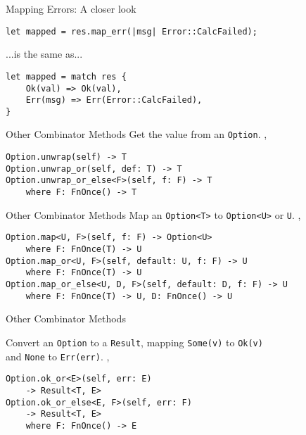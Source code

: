 
\begin{frame}[fragile]{Mapping Errors: A closer look}
\begin{verbatim}
let mapped = res.map_err(|msg| Error::CalcFailed);
\end{verbatim}
...is the same as...
\begin{verbatim}
let mapped = match res {
    Ok(val) => Ok(val),
    Err(msg) => Err(Error::CalcFailed),
}
\end{verbatim}
\end{frame}


\begin{frame}[fragile]{Other Combinator Methods}
Get the value from an \texttt{Option}.
\sep
\begin{verbatim}
Option.unwrap(self) -> T
Option.unwrap_or(self, def: T) -> T
Option.unwrap_or_else<F>(self, f: F) -> T
    where F: FnOnce() -> T
\end{verbatim}
\end{frame}


\begin{frame}[fragile]{Other Combinator Methods}
Map an \texttt{Option<T>} to \texttt{Option<U>} or \texttt{U}.
\sep
\begin{verbatim}
Option.map<U, F>(self, f: F) -> Option<U>
    where F: FnOnce(T) -> U
Option.map_or<U, F>(self, default: U, f: F) -> U
    where F: FnOnce(T) -> U
Option.map_or_else<U, D, F>(self, default: D, f: F) -> U
    where F: FnOnce(T) -> U, D: FnOnce() -> U
\end{verbatim}
\end{frame}


\begin{frame}[fragile]{Other Combinator Methods}

Convert an \texttt{Option} to a \texttt{Result}, mapping \texttt{Some(v)} to
\texttt{Ok(v)}\\and \texttt{None} to \texttt{Err(err)}.
\sep
\begin{verbatim}
Option.ok_or<E>(self, err: E)
    -> Result<T, E>
Option.ok_or_else<E, F>(self, err: F)
    -> Result<T, E>
    where F: FnOnce() -> E
\end{verbatim}
\end{frame}
